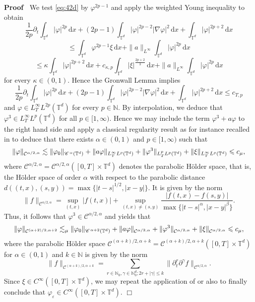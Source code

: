 \documentclass[a4paper,11pt]{article}
\newenvironment{proof}{\noindent\textbf{Proof\ }}{\hspace*{\fill}$\Box$\medskip}
\numberwithin{equation}{section}
\newcommand{\CC}{\mathscr{C} \hspace{.1em}}
\newcommand{\N}{\mathbb{N}}
\newcommand{\8}{\infty}
\newcommand{\dd}{\mathrm{d}}
\begin{document}
\begin{proof}
We test \eqref{eq:42d} by $\varphi^{2p-1}$ and apply the weighted Young inequality  to obtain
$$
\frac{1}{2p}\partial_{t}\int_{\mathbb{T}^{d}} |\varphi|^{2p}\,\dd x+(2p-1)\int_{\mathbb{T}^{d}} |\varphi|^{2p-2}|\nabla\varphi|^2\,\dd x+\int_{\mathbb{T}^{d}} |\varphi|^{2p+2}\,\dd x
$$
$$
\leqslant \int_{\mathbb{T}^{d}} \varphi^{2p-1}\xi\,\dd x+\|a\|_{L^{\8}}\int_{\mathbb{T}^{d}} |\varphi|^{2p}\,\dd x
$$
$$
\leqslant \kappa \int_{\mathbb{T}^{d}}|\varphi |^{2p+2}\,\dd x+c_{\kappa,p}\int_{\mathbb{T}^{d}}|\xi|^{\frac{2p+2}{3}}\,\dd x+\|a\|_{L^{\8}}\int_{\mathbb{T}^{d}} |\varphi|^{2p}\,\dd x
$$
for every $\kappa\in (0,1)$. Hence the Gronwall Lemma implies
$$
\frac{1}{2p}\partial_{t}\int_{\mathbb{T}^{d}} |\varphi|^{2p}\,\dd x+(2p-1)\int_{\mathbb{T}^{d}} |\varphi|^{2p-2}|\nabla\varphi|^2\,\dd x+\int_{\mathbb{T}^{d}} |\varphi|^{2p+2}\,\dd x\leqslant c_{T,p}
$$
and $\varphi\in L^{\infty}_{T}L^{2p}(\mathbb{T}^{d})$ for every $p\in\N$.
By interpolation, we deduce that $\varphi^3\in L^{\infty}_{T}L^{p}(\mathbb{T}^{d})$ for all $p\in [1,\infty)$. Hence we may include the  term $\varphi^{3}+a\varphi$ to the right hand side and apply a classical regularity result as for instance recalled in \cite[Theorem 3.1]{DDMH} to deduce that there exists $\alpha\in (0,1)$ and $p\in[1,\infty)$ such that
$$
\|\varphi\|_{\mathcal{C}^{\alpha/2,\alpha}}\lesssim \|\varphi_{0}\|_{\CC^{\alpha}(\mathbb{T}^{d})}+\|a\varphi\|_{L^{\infty}_{T}L^{p}(\mathbb{T}^{d})} + \|\varphi^3\|_{L^{p}_{T}L^{p}(\mathbb{T}^{d})} +  \|\xi\|_{L^{\infty}_{T}L^{p}(\mathbb{T}^{d})}\leqslant c_{\mu},
$$
where $\mathcal{C}^{\alpha/2,\alpha}=\mathcal{C}^{\alpha/2,\alpha}([0,T]\times \mathbb{T}^{d})$ denotes the parabolic H\"older space, that is, the H\"older space of order $\alpha$ with respect  to the parabolic distance $d((t,x),(s,y))=\max\{|t-s|^{1/2},|x-y|\}$. It is given by the norm
$$
\|f\|_{\mathcal{C}^{\alpha/2,\alpha}}=\sup_{(t,x)}|f(t,x)|+\sup_{(t,x)\neq(s,y)}\frac{|f(t,x)-f(s,y)|}{\max\{|t-s|^{\alpha},|x-y|^{\beta}\}}.
$$
Thus, it follows that $\varphi^{3}\in  \mathcal{C}^{\alpha/2,\alpha}$ and \cite[Theorem 3.4]{DDMH} yields that
$$
\|\varphi\|_{\mathcal{C}^{(\alpha+2)/2,\alpha+2}}\lesssim_{\mu} \|\varphi_{0}\|_{\CC^{\alpha+2}(\mathbb{T}^{d})}+\|a\varphi\|_{\mathcal{C}^{\alpha/2,\alpha}}+ \|\varphi^3\|_{\mathcal{C}^{\alpha/2,\alpha}} +  \|\xi\|_{\mathcal{C}^{\alpha/2,\alpha}}\leqslant c_{\mu},
$$
where the parabolic H\"older space  $\mathcal{C}^{(\alpha+k)/2,\alpha+k}=\mathcal{C}^{(\alpha+k)/2,\alpha+k}([0,T]\times \mathbb{T}^{d})$ for $\alpha\in (0,1)$ and $k\in\N$ is given by the norm
$$
\|f\|_{\mathcal{C}^{(\alpha+k)/2,\alpha+k}}=\sum_{r\in\N_{0},\gamma\in \N_{0}^{d};2r+|\gamma|\leqslant k}\|\partial^{r}_{t}\partial^{\gamma}f\|_{\mathcal{C}^{\alpha/2,\alpha}}.
$$
Since $\xi\in C^{\infty}([0,T]\times \mathbb{T}^{d})$, we may repeat the application of  \cite[Theorem 3.4]{DDMH} or also \cite[Chapter IV, Theorem 5.2]{LSU} to finally conclude that $\varphi_{\varepsilon}\in C^{\infty}([0,T]\times \mathbb{T}^{d}).$
\end{proof}
\end{document}
